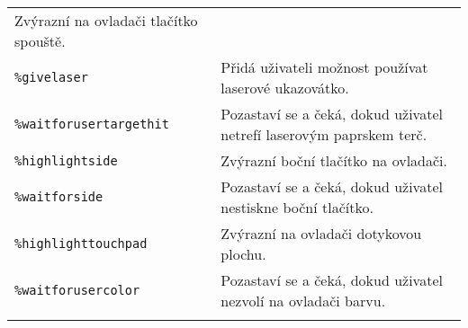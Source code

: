 \begin{longtable}[]{@{}ll@{}}
\begin{minipage}[t]{0.05\columnwidth}
Zvýrazní na ovladači tlačítko spouště.\strut
\end{minipage}\tabularnewline
\begin{minipage}[t]{0.05\columnwidth}\raggedright\strut
\texttt{\%givelaser}\strut
\end{minipage} & \begin{minipage}[t]{0.05\columnwidth}\raggedright\strut
Přidá uživateli možnost používat laserové ukazovátko.\strut
\end{minipage}\tabularnewline
\begin{minipage}[t]{0.05\columnwidth}\raggedright\strut
\texttt{\%waitforusertargethit}\strut
\end{minipage} & \begin{minipage}[t]{0.05\columnwidth}\raggedright\strut
Pozastaví se a čeká, dokud uživatel netrefí laserovým paprskem
terč.\strut
\end{minipage}\tabularnewline
\begin{minipage}[t]{0.05\columnwidth}\raggedright\strut
\texttt{\%highlightside}\strut
\end{minipage} & \begin{minipage}[t]{0.05\columnwidth}\raggedright\strut
Zvýrazní boční tlačítko na ovladači.\strut
\end{minipage}\tabularnewline
\begin{minipage}[t]{0.05\columnwidth}\raggedright\strut
\texttt{\%waitforside}\strut
\end{minipage} & \begin{minipage}[t]{0.05\columnwidth}\raggedright\strut
Pozastaví se a čeká, dokud uživatel nestiskne boční tlačítko.\strut
\end{minipage}\tabularnewline
\begin{minipage}[t]{0.05\columnwidth}\raggedright\strut
\texttt{\%highlighttouchpad}\strut
\end{minipage} & \begin{minipage}[t]{0.05\columnwidth}\raggedright\strut
Zvýrazní na ovladači dotykovou plochu.\strut
\end{minipage}\tabularnewline
\begin{minipage}[t]{0.05\columnwidth}\raggedright\strut
\texttt{\%waitforusercolor}\strut
\end{minipage} & \begin{minipage}[t]{0.05\columnwidth}\raggedright\strut
Pozastaví se a čeká, dokud uživatel nezvolí na ovladači barvu.\strut
\end{minipage}\tabularnewline
\begin{minipage}[t]{0.05\columnwidth}\raggedright\strut

\end{minipage}
\end{longtable}
